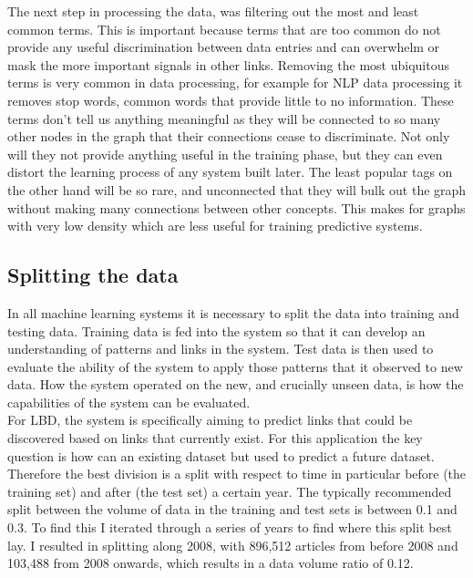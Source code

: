 \documentclass{l4proj}
\begin{document}
The next step in processing the data, was filtering out the most and least common terms. This is important because terms that are too common do not provide any useful discrimination between data entries and can overwhelm or mask the more important signals in other links. Removing the most ubiquitous terms is very common in data processing, for example for NLP data processing it removes stop words, common words that provide little to no information. These terms  don't tell us anything meaningful as they will be connected to so many other nodes in the graph that their connections cease to discriminate. Not only will they not provide anything useful in the training phase, but they can even distort the learning process of any system built later. The least popular tags on the other hand will be so rare, and unconnected that they will bulk out the graph without making many connections between other concepts. This makes for graphs with very low density which are less useful for training predictive systems.\\

\subsection{Splitting the data}

In all machine learning systems it is necessary to split the data into training and testing data. Training data is fed into the system so that it can develop an understanding of patterns and links in the system. Test data is then used to evaluate the ability of the system to apply those patterns that it observed to new data. How the system operated on the new, and crucially unseen data, is how the capabilities of the system can be evaluated. \\

For LBD, the system is specifically aiming to predict links that could be discovered based on links that currently exist. For this application the key question is how can an existing dataset but used to predict a future dataset. Therefore the best division is a split with respect to time in particular before (the training set) and after (the test set) a certain year. The typically recommended split between the volume of data in the training and test sets is between 0.1 and 0.3. To find this I iterated through a series of years to find where this split best lay. I resulted in splitting along 2008, with 896,512 articles from before 2008 and 103,488 from 2008 onwards, which results in a data volume ratio of 0.12. \\
\end{document}
